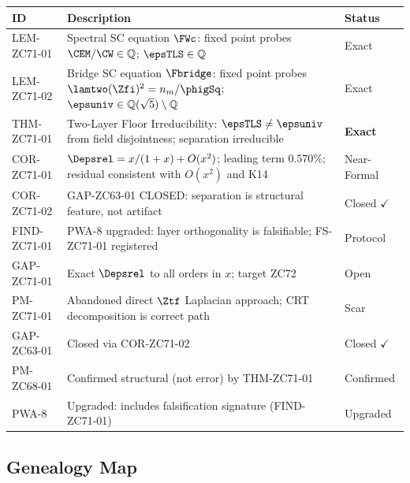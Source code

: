 \documentclass[12pt, a4paper]{article}
\begin{document}
\begin{formalbox}[title={Atomic Registry --- ZC71}]
\begin{center}
\renewcommand{\arraystretch}{1.3}
\small
\begin{tabular}{lp{8.2cm}l}
\toprule
ID & Description & Status \\
\midrule
LEM-ZC71-01
  & Spectral SC equation $\FWc$: fixed point probes $\CEM/\CW\in\mathbb{Q}$;
    $\epsTLS\in\mathbb{Q}$
  & Exact \\[3pt]
LEM-ZC71-02
  & Bridge SC equation $\Fbridge$: fixed point probes $\lamtwo(\Zfi)^2 = n_m/\phigSq$;
    $\epsuniv\in\mathbb{Q}(\sqrt{5})\setminus\mathbb{Q}$
  & Exact \\[3pt]
THM-ZC71-01
  & Two-Layer Floor Irreducibility: $\epsTLS\neq\epsuniv$ from field disjointness;
    separation irreducible
  & \textbf{Exact} \\[3pt]
COR-ZC71-01
  & $\Depsrel = x/(1+x) + O(x^2)$; leading term $0.570\%$; residual consistent
    with $O(x^2)$ and K14
  & Near-Formal \\[3pt]
COR-ZC71-02
  & GAP-ZC63-01 CLOSED: separation is structural feature, not artifact
  & Closed $\checkmark$ \\[3pt]
FIND-ZC71-01
  & PWA-8 upgraded: layer orthogonality is falsifiable; FS-ZC71-01 registered
  & Protocol \\[3pt]
GAP-ZC71-01
  & Exact $\Depsrel$ to all orders in $x$; target ZC72
  & Open \\[3pt]
PM-ZC71-01
  & Abandoned direct $\Ztf$ Laplacian approach; CRT decomposition is correct path
  & Scar \\
\midrule
GAP-ZC63-01  & Closed via COR-ZC71-02 & Closed $\checkmark$ \\
PM-ZC68-01   & Confirmed structural (not error) by THM-ZC71-01 & Confirmed \\
PWA-8        & Upgraded: includes falsification signature (FIND-ZC71-01) & Upgraded \\
\bottomrule
\end{tabular}
\end{center}
\end{formalbox}


\subsection{Genealogy Map}
\label{sec:genealogy}
\end{document}
